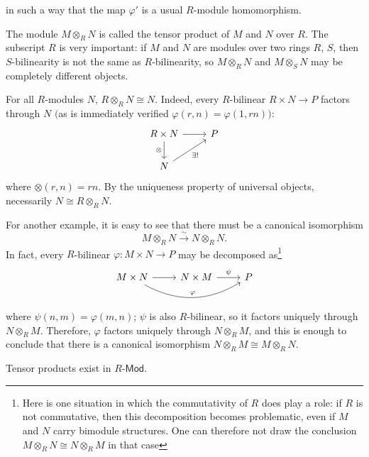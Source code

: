 in such a way that the map $\varphi'$ is a usual $R$-module homomorphism.\par 
The module $M\otimes_{R}N$ is called the tensor product of $M$ and $N$ over $R$. The subscript $R$ is very important: if $M$ and $N$ are modules over two rings $R$, $S$, then $S$-bilinearity is not the same as $R$-bilinearity, so $M\otimes_{R}N$ and $M\otimes_{S}N$ may be completely different objects.
\begin{example}
For all $R$-modules $N$, $R\otimes_{R} N\cong N$. Indeed, every $R$-bilinear $R\times N\to P$ factors through $N$ $($as is immediately verified $\varphi(r,n)=\varphi(1,rn)$$)$:
\[\begin{tikzcd}
R\times N\ar[d,swap,"\otimes"]\ar[r]&P\\
N\ar[ru,swap,"\exists !"]
\end{tikzcd}\]
where $\otimes(r,n)=rn$. By the uniqueness property of universal objects, necessarily $N\cong R\otimes_RN$.
\end{example}
\begin{example}
For another example, it is easy to see that there must be a canonical isomorphism
\[M\otimes_{R}N\stackrel{\sim}{\longrightarrow}N\otimes_{R}N.\]
In fact, every $R$-bilinear $\varphi:M\times N\to P$ may be decomposed as\footnote{Here is one situation in which the commutativity of $R$ does play a role: if $R$ is not commutative, then this decomposition becomes problematic, even if $M$ and $N$ carry bimodule structures. One can therefore not draw the conclusion $M\otimes_{R}N\cong N\otimes_{R} M$ in that case}
\[\begin{tikzcd}
M\times N\ar[rr,bend right,"\varphi"]\ar[r]&N\times M\ar[r,"\psi"]&P
\end{tikzcd}\]
where $\psi(n,m)=\varphi(m,n)$; $\psi$ is also $R$-bilinear, so it factors uniquely through $N\otimes_{R}M$. Therefore, $\varphi$ factors uniquely through $N\otimes_RM$, and this is enough to conclude that there is a canonical isomorphism $N\otimes_{R} M\cong M\otimes_RN$.
\end{example}
\begin{lemma}
Tensor products exist in $R$-$\mathsf{Mod}$.
\end{lemma}
